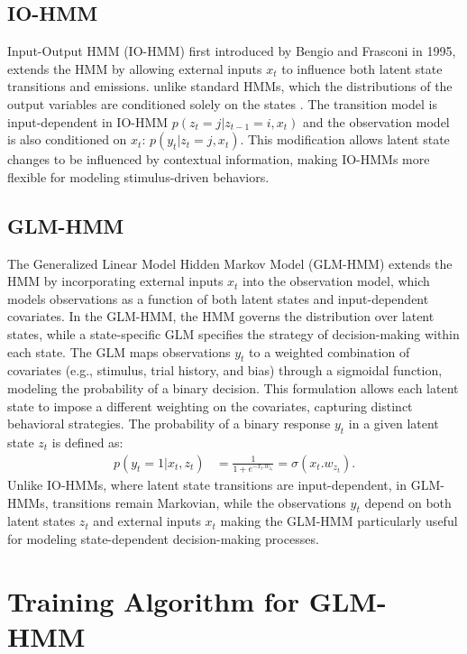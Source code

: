 \subsection{IO-HMM}
Input-Output HMM (IO-HMM) first introduced by Bengio and Frasconi in 1995, extends the HMM by allowing external inputs $x_{t}$ to influence both latent state transitions and emissions.  unlike standard HMMs, which the distributions of the output variables  are conditioned solely  on the states . The transition model is  input-dependent in IO-HMM $p(z_{t}=j|z_{t-1}=i,x_{t})$
and the observation model is also conditioned on $x_{t}$: $p(y_{t}|z_{t}=j,x_{t}) $. This modification allows latent state changes to be influenced by contextual information, making IO-HMMs more flexible for modeling stimulus-driven behaviors. 


\subsection{GLM-HMM}
The Generalized Linear Model Hidden Markov Model (GLM-HMM) extends the HMM by incorporating external inputs $x_{t}$ into the observation model, which models observations as a function of both latent states and input-dependent covariates. In the GLM-HMM, the HMM governs the distribution over latent states, while a state-specific GLM specifies the strategy of decision-making within each state. The GLM maps observations $y_{t}$ 
to a weighted combination of covariates (e.g., stimulus, trial history, and bias) through a sigmoidal function, modeling the probability of a binary decision. This formulation allows each latent state to impose a different weighting on the covariates, capturing distinct behavioral strategies.
The probability of a binary response $y_{t}$ in a given latent state $z_{t}$ is defined as:
\begin{align}
p(y_{t}=1|x_{t},z_{t}) &= \frac{1}{1 + e^{-x_{t}.w_{z_{t}}}}=\sigma(x_{t}.w_{z_{t}}).
\end{align}
Unlike IO-HMMs, where latent state transitions are input-dependent, in GLM-HMMs, transitions remain Markovian, while the observations $y_{t}$ depend on both latent states $z_{t}$ and external inputs $x_{t}$ making the GLM-HMM particularly useful for modeling state-dependent decision-making processes.  

\section{Training Algorithm for GLM-HMM}

